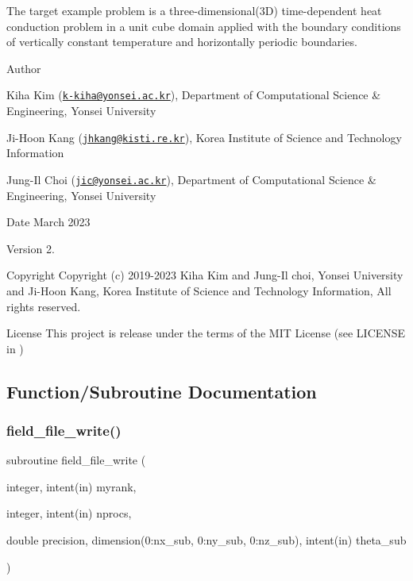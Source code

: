 The target example problem is a three-\/dimensional(3D) time-\/dependent heat conduction problem in a unit cube domain applied with the boundary conditions of vertically constant temperature and horizontally periodic boundaries. \begin{DoxyAuthor}{Author}

\begin{DoxyItemize}
\item Kiha Kim (\href{mailto:k-kiha@yonsei.ac.kr}{\tt k-\/kiha@yonsei.\+ac.\+kr}), Department of Computational Science \& Engineering, Yonsei University
\item Ji-\/\+Hoon Kang (\href{mailto:jhkang@kisti.re.kr}{\tt jhkang@kisti.\+re.\+kr}), Korea Institute of Science and Technology Information
\item Jung-\/\+Il Choi (\href{mailto:jic@yonsei.ac.kr}{\tt jic@yonsei.\+ac.\+kr}), Department of Computational Science \& Engineering, Yonsei University
\end{DoxyItemize}
\end{DoxyAuthor}
\begin{DoxyDate}{Date}
March 2023 
\end{DoxyDate}
\begin{DoxyVersion}{Version}
2. 
\end{DoxyVersion}
\begin{DoxyParagraph}{Copyright}
Copyright (c) 2019-\/2023 Kiha Kim and Jung-\/\+Il choi, Yonsei University and Ji-\/\+Hoon Kang, Korea Institute of Science and Technology Information, All rights reserved. 
\end{DoxyParagraph}
\begin{DoxyParagraph}{License }
This project is release under the terms of the M\+IT License (see L\+I\+C\+E\+N\+SE in ) 
\end{DoxyParagraph}


\subsection{Function/\+Subroutine Documentation}
\mbox{\label{main_8f90_af0a1310807f21ee1a2c0fdf14c58b63b}} 
\subsubsection{\texorpdfstring{field\+\_\+file\+\_\+write()}{field\_file\_write()}}
{\footnotesize\ttfamily subroutine field\+\_\+file\+\_\+write (\begin{DoxyParamCaption}\item[{integer, intent(in)}]{myrank,  }\item[{integer, intent(in)}]{nprocs,  }\item[{double precision, dimension(0\+:nx\+\_\+sub, 0\+:ny\+\_\+sub, 0\+:nz\+\_\+sub), intent(in)}]{theta\+\_\+sub }\end{DoxyParamCaption})}



